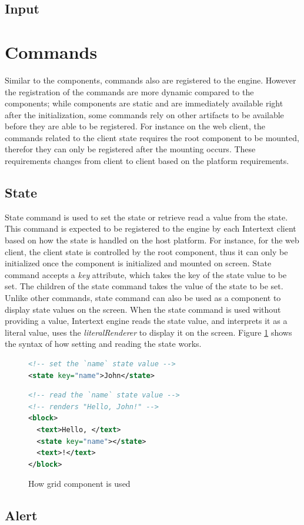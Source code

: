 \subsection{Input}

\section{Commands}

Similar to the components, commands also are registered to the engine. However the registration of the commands are more dynamic compared to the components; while components are static and are immediately available right after the initialization, some commands rely on other artifacts to be available before they are able to be registered. For instance on the web client, the commands related to the client state requires the root component to be mounted, therefor they can only be registered after the mounting occurs. These requirements changes from client to client based on the platform requirements.

\subsection{State}

State command is used to set the state or retrieve read a value from the state. This command is expected to be registered to the engine by each Intertext client based on how the state is handled on the host platform. For instance, for the web client, the client state is controlled by the root component, thus it can only be initialized once the component is initialized and mounted on screen. State command accepts a \textit{key} attribute, which takes the key of the state value to be set. The children of the state command takes the value of the state to be set. Unlike other commands, state command can also be used as a component to display state values on the screen. When the state command is used without providing a value, Intertext engine reads the state value, and interprets it as a literal value, uses the \textit{literalRenderer} to display it on the screen. Figure \ref{fig:how_state_is_set_and_read} shows the syntax of how setting and reading the state works.

\begin{figure}
\begin{minipage}{\linewidth}
\begin{lstlisting}[language=xml]
<!-- set the `name` state value -->
<state key="name">John</state>
\end{lstlisting}
\begin{lstlisting}[language=xml]
<!-- read the `name` state value -->
<!-- renders "Hello, John!" -->
<block>
  <text>Hello, </text>
  <state key="name"></state>
  <text>!</text>
</block>
\end{lstlisting}
\end{minipage}
\caption{How grid component is used}%
\label{fig:how_state_is_set_and_read}%
\end{figure}

\subsection{Alert}

